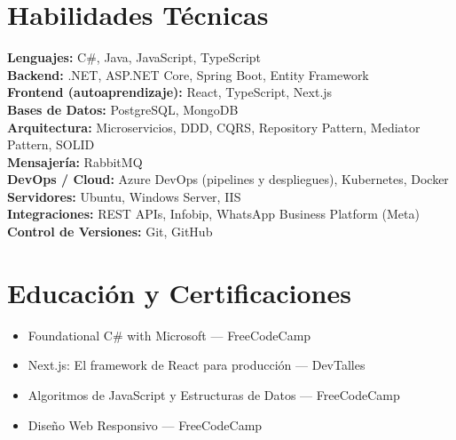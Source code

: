 \documentclass[10.5pt,a4paper]{article}
\newcommand{\skillrow}[2]{%
  \noindent\textbf{\color{darkgray}#1:} #2\\[2pt]
}
\begin{document}
\section*{Habilidades Técnicas}
\skillrow{Lenguajes}{C\#, Java, JavaScript, TypeScript}
\skillrow{Backend}{.NET, ASP.NET Core, Spring Boot, Entity Framework}
\skillrow{Frontend (autoaprendizaje)}{React, TypeScript, Next.js}
\skillrow{Bases de Datos}{PostgreSQL, MongoDB}
\skillrow{Arquitectura}{Microservicios, DDD, CQRS, Repository Pattern, Mediator Pattern, SOLID}
\skillrow{Mensajería}{RabbitMQ}
\skillrow{DevOps / Cloud}{Azure DevOps (pipelines y despliegues), Kubernetes, Docker}
\skillrow{Servidores}{Ubuntu, Windows Server, IIS}
\skillrow{Integraciones}{REST APIs, Infobip, WhatsApp Business Platform (Meta)}
\skillrow{Control de Versiones}{Git, GitHub}

\section*{Educación y Certificaciones}
\begin{itemize}
  \item Foundational C\# with Microsoft --- FreeCodeCamp
  \item Next.js: El framework de React para producción --- DevTalles
  \item Algoritmos de JavaScript y Estructuras de Datos --- FreeCodeCamp
  \item Diseño Web Responsivo --- FreeCodeCamp
\end{itemize}
\end{document}
